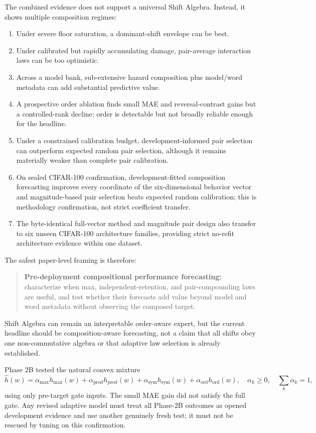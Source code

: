 \documentclass[11pt,a4paper]{article}
\begin{document}
The combined evidence does not support a universal Shift Algebra.  Instead, it
shows multiple composition regimes:
\begin{enumerate}
  \item Under severe floor saturation, a dominant-shift envelope can be best.
  \item Under calibrated but rapidly accumulating damage, pair-average
  interaction laws can be too optimistic.
  \item Across a model bank, sub-extensive hazard composition plus model/word
  metadata can add substantial predictive value.
  \item A prospective order ablation finds small MAE and reversal-contrast
  gains but a controlled-rank decline; order is detectable but not broadly
  reliable enough for the headline.
  \item Under a constrained calibration budget, development-informed pair
  selection can outperform expected random pair selection, although it remains
  materially weaker than complete pair calibration.
  \item On sealed CIFAR-100 confirmation, development-fitted composition
  forecasting improves every coordinate of the six-dimensional behavior
  vector and magnitude-based pair selection beats expected random calibration;
  this is methodology confirmation, not strict coefficient transfer.
  \item The byte-identical full-vector method and magnitude pair design also
  transfer to six unseen CIFAR-100 architecture families, providing strict
  no-refit architecture evidence within one dataset.
\end{enumerate}

The safest paper-level framing is therefore:
\begin{quote}
\textbf{Pre-deployment compositional performance forecasting:} characterize
when max, independent-retention, and pair-compounding laws are useful, and test
whether their forecasts add value beyond model and word metadata without
observing the composed target.
\end{quote}
Shift Algebra can remain an interpretable order-aware expert, but the current
headline should be composition-aware forecasting, not a claim that all shifts
obey one non-commutative algebra or that adaptive law selection is already
established.

Phase 2B tested the natural convex mixture
\[
\widehat h(w)=
\alpha_{\max}h_{\max}(w)+
\alpha_{\mathrm{prod}}h_{\mathrm{prod}}(w)+
\alpha_{\mathrm{sym}}h_{\mathrm{sym}}(w)+
\alpha_{\mathrm{ord}}h_{\mathrm{ord}}(w),
\quad
\alpha_k\ge0,\quad\sum_k\alpha_k=1,
\]
using only pre-target gate inputs.  The small MAE gain did not satisfy the full
gate.  Any revised adaptive model must treat all Phase-2B outcomes as opened
development evidence and use another genuinely fresh test; it must not be
rescued by tuning on this confirmation.
\end{document}

